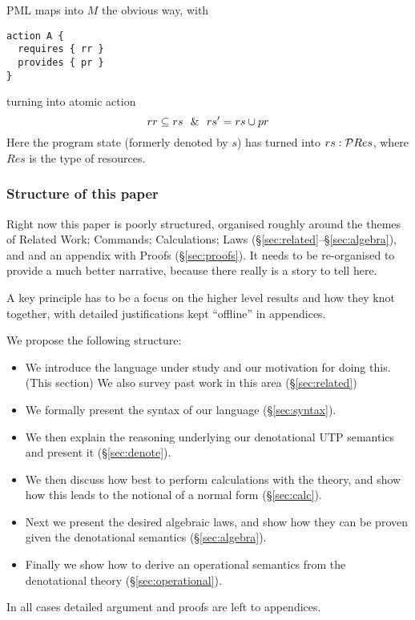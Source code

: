 PML maps into $M$ the obvious way,
with
\begin{verbatim}
action A {
  requires { rr }
  provides { pr }
}
\end{verbatim}
turning into atomic action
\[
rr \subseteq rs ~~\&~~ rs' = rs \cup pr
\]
Here the program state (formerly denoted by $s$)
has turned into $rs:\mathcal{P} Res$, where $Res$ is the type of resources.

\subsubsection{Structure of this paper}

Right now this paper is poorly structured,
organised roughly around the themes of
Related Work;
Commands;
Calculations;
Laws (\S\ref{sec:related}--\S\ref{sec:algebra}),
and and an appendix with Proofs (\S\ref{sec:proofs}).
It needs to be re-organised to provide a much better narrative,
because there really is a story to tell here.

A key principle has to be a focus on the higher level results and how
they knot together,
with detailed justifications kept ``offline'' in appendices.

We propose the following structure:
\begin{itemize}
  \item
     We introduce the language under study and our motivation for doing this.
     (This section)
     We also survey past work in this area (\S\ref{sec:related})
  \item
    We formally present the syntax of our language (\S\ref{sec:syntax}).
  \item
     We then explain the reasoning underlying our denotational
     UTP semantics and present it (\S\ref{sec:denote}).
  \item
     We then discuss how best to perform calculations with the theory,
     and show how this leads to the notional of a normal form
     (\S\ref{sec:calc}).
  \item
     Next we present the desired algebraic laws,
     and show how they can be proven given the denotational semantics
     (\S\ref{sec:algebra}).
  \item
     Finally we show how to derive an operational semantics from
     the denotational theory
     (\S\ref{sec:operational}).
\end{itemize}
In all cases detailed argument and proofs are left to appendices.
